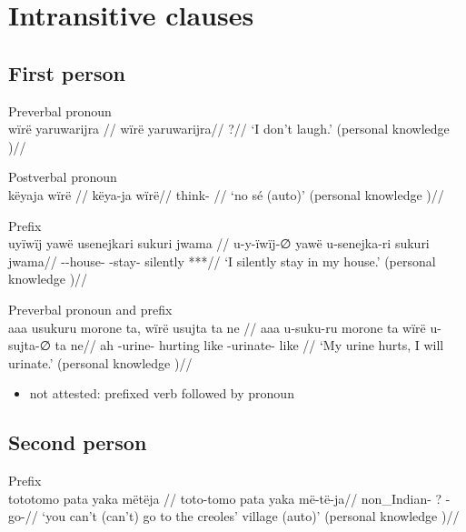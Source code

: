 \documentclass{memoir}
\begin{document}
\section{Intransitive clauses}

\subsection{First person}

\ex  Preverbal pronoun  \\\label{convrisamaj-4}
\begingl \glpreamble wïrë yaruwarijra //
\gla wïrë yaruwarijra//
\glb {} ?//
\glft ‘I don’t laugh.’ (personal knowledge
)//
\endgl
\xe

\ex  Postverbal pronoun  \\\label{convfemgrme-298}
\begingl \glpreamble këyaja wïrë //
\gla këya-ja wïrë//
\glb think- //
\glft ‘no sé (auto)’ (personal knowledge
)//
\endgl
\xe

\ex  Prefix  \\\label{convrisamaj-28}
\begingl \glpreamble uyïwïj yawë usenejkari sukuri jwama //
\gla u-y-ïwïj-∅ yawë u-senejka-ri sukuri jwama//
\glb {}--house-  -stay- silently ***//
\glft ‘I silently stay in my house.’ (personal knowledge
)//
\endgl
\xe

\ex  Preverbal pronoun and prefix  \\\label{ctorat-23}
\begingl \glpreamble aaa usukuru morone ta, wïrë usujta ta ne //
\gla aaa u-suku-ru morone ta wïrë u-sujta-∅ ta ne//
\glb ah -urine- hurting like  -urinate- like //
\glft ‘My urine hurts, I will urinate.’ (personal knowledge
)//
\endgl
\xe

\begin{itemize}
\tightlist
\item
  not attested: prefixed verb followed by pronoun
\end{itemize}

\subsection{Second person}

\ex  Prefix  \\\label{convamgu-7}
\begingl \glpreamble tototomo pata yaka mëtëja //
\gla toto-tomo pata yaka më-të-ja//
\glb non\_Indian- ?  -go-//
\glft ‘you can't (can't) go to the creoles' village (auto)’ (personal knowledge
)//
\endgl
\xe
\end{document}
